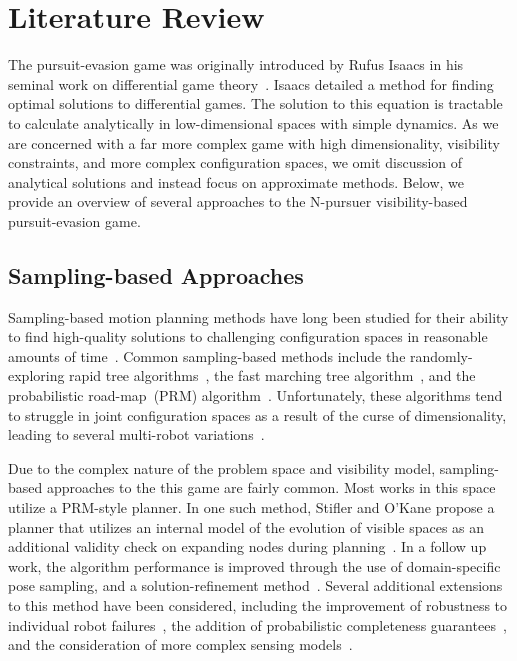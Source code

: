 \documentclass[conference]{IEEEtran}
\begin{document}
\section{Literature Review}\label{sec:lit_rev}
The pursuit-evasion game was originally introduced by Rufus Isaacs in his seminal work on differential game theory~\cite{diff_games}.
Isaacs detailed a method for finding optimal solutions to differential games.
The solution to this equation is tractable to calculate analytically in low-dimensional spaces with simple dynamics.
As we are concerned with a far more complex game with high dimensionality, visibility constraints, and more complex configuration spaces, we omit discussion of analytical solutions and instead focus on approximate methods.
Below, we provide an overview of several approaches to the N-pursuer visibility-based pursuit-evasion game. 

\subsection{Sampling-based Approaches}

Sampling-based motion planning methods have long been studied for their ability to find high-quality solutions to challenging configuration spaces in reasonable amounts of time~\cite{FMT}.
Common sampling-based methods include the randomly-exploring rapid tree algorithms~\cite{lavalle98rrt}, the fast marching tree algorithm~\cite{FMT}, and the probabilistic road-map~(PRM) algorithm~\cite{kavraki1996probabilistic}.
Unfortunately, these algorithms tend to struggle in joint configuration spaces as a result of the curse of dimensionality, leading to several multi-robot variations~\cite{CLARK2005244}.

Due to the complex nature of the problem space and visibility model, sampling-based approaches to the this game are fairly common.
Most works in this space utilize a PRM-style planner.
In one such method, Stifler and O'Kane propose a planner that utilizes an internal model of the evolution of visible spaces as an additional validity check on expanding nodes during planning~\cite{stiffler2014sampling}.
In a follow up work, the algorithm performance is improved through the use of domain-specific pose sampling, and a solution-refinement method~\cite{vis_roadmap}.
Several additional extensions to this method have been considered, including the improvement of robustness to individual robot failures~\cite{stiffler2020planning}, the addition of probabilistic completeness guarantees~\cite{stiffler2024asymptotically}, and the consideration of more complex sensing models~\cite{stiffler2016pursuit}.
\end{document}
